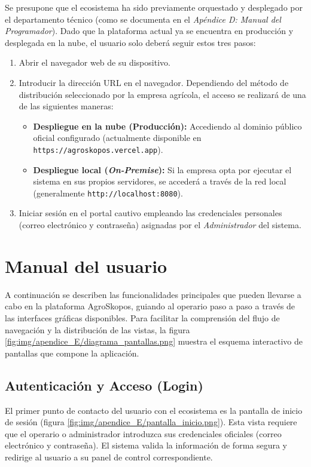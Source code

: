 Se presupone que el ecosistema ha sido previamente orquestado y desplegado por el departamento técnico (como se documenta en el \textit{Apéndice D: Manual del Programador}). Dado que la plataforma actual ya se encuentra en producción y desplegada en la nube, el usuario solo deberá seguir estos tres pasos:

\begin{enumerate}
    \item Abrir el navegador web de su dispositivo.
    \item Introducir la dirección URL en el navegador. Dependiendo del método de distribución seleccionado por la empresa agrícola, el acceso se realizará de una de las siguientes maneras:
    \begin{itemize}
        \item \textbf{Despliegue en la nube (Producción):} Accediendo al dominio público oficial configurado (actualmente disponible en \texttt{https://agroskopos.vercel.app}).
        \item \textbf{Despliegue local (\textit{On-Premise}):} Si la empresa opta por ejecutar el sistema en sus propios servidores, se accederá a través de la red local (generalmente \texttt{http://localhost:8080}).
    \end{itemize}
    \item Iniciar sesión en el portal cautivo empleando las credenciales personales (correo electrónico y contraseña) asignadas por el \textit{Administrador} del sistema.
\end{enumerate}

\section{Manual del usuario}
A continuación se describen las funcionalidades principales que pueden llevarse a cabo en la plataforma AgroSkopos, guiando al operario paso a paso a través de las interfaces gráficas disponibles. Para facilitar la comprensión del flujo de navegación y la distribución de las vistas, la figura \ref{fig:img/apendice_E/diagrama_pantallas.png} muestra el esquema interactivo de pantallas que compone la aplicación.


\subsection{Autenticación y Acceso (Login)}
El primer punto de contacto del usuario con el ecosistema es la pantalla de inicio de sesión (figura \ref{fig:img/apendice_E/pantalla_inicio.png}). Esta vista requiere que el operario o administrador introduzca sus credenciales oficiales (correo electrónico y contraseña). El sistema valida la información de forma segura y redirige al usuario a su panel de control correspondiente.

